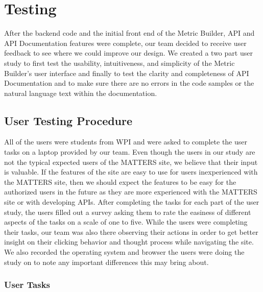 \chapter{Testing}

After the backend code and the initial front end of the Metric Builder, API and API Documentation features were complete, our team decided to receive user feedback to see where we could improve our design. We created a two part user study to first test the usability, intuitiveness, and simplicity of the Metric Builder’s user interface and finally to test the clarity and completeness of API Documentation and to make sure there are no errors in the code samples or the natural language text within the documentation. 

\section{User Testing Procedure}

All of the users were students from WPI and were asked to complete the user tasks on a laptop provided by our team. Even though the users in our study are not the typical expected users of the MATTERS site, we believe that their input is valuable. If the features of the site are easy to use for users inexperienced with the MATTERS site, then we should expect the features to be easy for the authorized users in the future as they are more experienced with the MATTERS site or with developing APIs. After completing the tasks for each part of the user study, the users filled out a survey asking them to rate the easiness of different aspects of the tasks on a scale of one to five. While the users were completing their tasks, our team was also there observing their actions in order to get better insight on their clicking behavior and thought process while navigating the site. We also recorded the operating system and browser the users were doing the study on to note any important differences this may bring about.

	\subsection{User Tasks}
	

